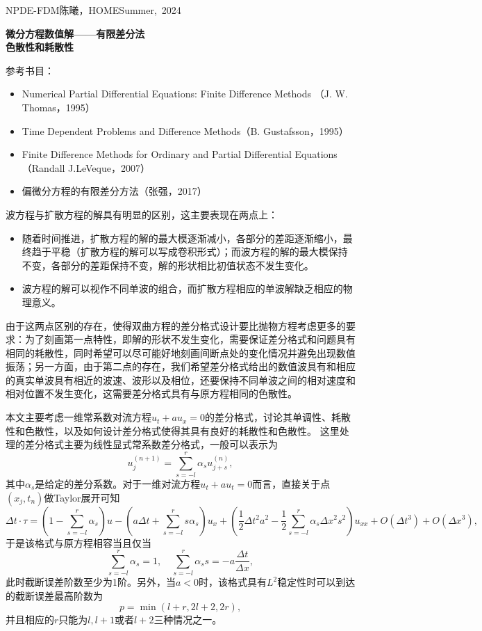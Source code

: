 \documentclass[a4paper,10pt]{ctexart}
\begin{document}
\hfill\vbox{\hbox{NPDE-FDM}\hbox{陈曦，HOME}\hbox{Summer, 2024}}

\begin{center}\Large
    \textbf{微分方程数值解——有限差分法}\\{\normalsize\bf {色散性和耗散性}}
\end{center}
\vskip 30pt
\small {参考书目：
\begin{itemize}
    \item Numerical Partial Differential Equations: Finite Difference Methods （J. W. Thomas，1995）
    \item Time Dependent Problems and Difference Methods（B. Gustafsson，1995）
    \item Finite Difference Methods for Ordinary and Partial Differential Equations（Randall J.LeVeque，2007）
    \item 偏微分方程的有限差分方法（张强，2017）
\end{itemize}}
波方程与扩散方程的解具有明显的区别，这主要表现在两点上：
\begin{itemize}
    \item 随着时间推进，扩散方程的解的最大模逐渐减小，各部分的差距逐渐缩小，最终趋于平稳（扩散方程的解可以写成卷积形式）；而波方程的解的最大模保持不变，各部分的差距保持不变，解的形状相比初值状态不发生变化。
    \item 波方程的解可以视作不同单波的组合，而扩散方程相应的单波解缺乏相应的物理意义。
\end{itemize}
由于这两点区别的存在，使得双曲方程的差分格式设计要比抛物方程考虑更多的要求：为了刻画第一点特性，即解的形状不发生变化，需要保证差分格式和问题具有相同的耗散性，同时希望可以尽可能好地刻画间断点处的变化情况并避免出现数值振荡；另一方面，由于第二点的存在，我们希望差分格式给出的数值波具有和相应的真实单波具有相近的波速、波形以及相位，还要保持不同单波之间的相对速度和相对位置不发生变化，这需要差分格式具有与原方程相同的色散性。

本文主要考虑一维常系数对流方程$ u_t+au_x=0 $的差分格式，讨论其单调性、耗散性和色散性，以及如何设计差分格式使得其具有良好的耗散性和色散性。
这里处理的差分格式主要为线性显式常系数差分格式，一般可以表示为
\begin{equation}\label{eq:explict}
    u^{(n+1)}_j = \sum_{s=-l}^r \alpha_s u^{(n)}_{j+s},
\end{equation}
其中$ \alpha_s $是给定的差分系数。对于一维对流方程$ u_t+au_t=0 $而言，直接关于点$ (x_j,t_n) $做Taylor展开可知
\[
    \Delta t\cdot \tau = (1 - \sum_{s=-l}^r \alpha_s)u - (a \Delta t + \sum_{s=-l}^r s \alpha_s)u_x + (\frac{1}{2}\Delta t^2 a^2 - \frac{1}{2}\sum_{s=-l}^r \alpha_s \Delta x^2 s^2)u_{xx} + O(\Delta t^3) + O(\Delta x^3),
\]
于是该格式与原方程相容当且仅当
\begin{equation}
    \sum_{s=-l}^r \alpha_s = 1, \quad \sum_{s=-l}^r \alpha_s s = -a \frac{\Delta t}{\Delta x},
\end{equation}
此时截断误差阶数至少为1阶。另外，当$ a<0 $时，该格式具有$ L^2 $稳定性时可以到达的截断误差最高阶数为
\begin{equation}
    p = \min(l+r,2l+2,2r),
\end{equation}
并且相应的$ r $只能为$ l,l+1 $或者$ l+2 $三种情况之一。
\end{document}
